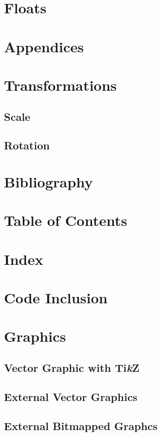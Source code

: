 \section{Floats}

\section{Appendices}

\section{Transformations}
\subsection{Scale}
\subsection{Rotation}

\section{Bibliography}
\section{Table of Contents}
\section{Index}

\section{Code Inclusion}

\section{Graphics}
\subsection{Vector Graphic with Ti\textit{k}Z}
\subsection{External Vector Graphics}
\subsection{External Bitmapped Graphcs}

